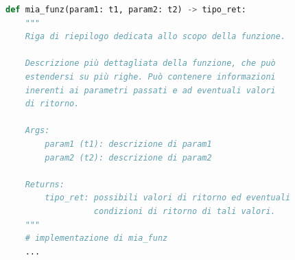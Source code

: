 \begin{lstlisting}[language=Python, caption={Formato Google per la documentazione del codice mediante docstring.}, label={lst:docstring_schema_google}]
def mia_funz(param1: t1, param2: t2) -> tipo_ret:
    """
    Riga di riepilogo dedicata allo scopo della funzione.

    Descrizione più dettagliata della funzione, che può
    estendersi su più righe. Può contenere informazioni
    inerenti ai parametri passati e ad eventuali valori
    di ritorno.
    
    Args:
        param1 (t1): descrizione di param1
        param2 (t2): descrizione di param2

    Returns:
        tipo_ret: possibili valori di ritorno ed eventuali
                  condizioni di ritorno di tali valori.    
    """
    # implementazione di mia_funz
    ...
\end{lstlisting}


